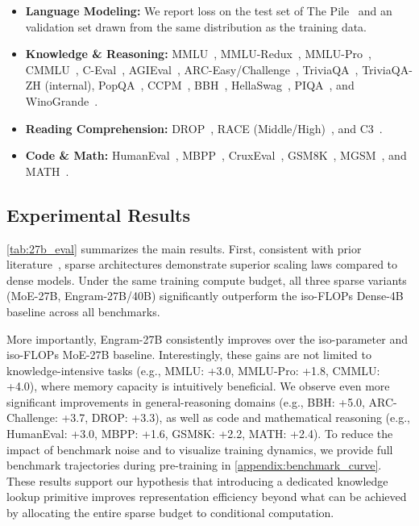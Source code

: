 \begin{itemize}
    \item \textbf{Language Modeling:}
    We report loss on the test set of The Pile~\citep{gao2020pile} and an validation set drawn from the same distribution as the training data.

    \item \textbf{Knowledge \& Reasoning:}
    MMLU~\citep{hendrycks2020measuring}, MMLU-Redux~\citep{gema2025we}, MMLU-Pro~\citep{wang2024mmlu}, CMMLU~\citep{li2024cmmlu}, C-Eval~\citep{huang2023c}, AGIEval~\citep{zhong2024agieval}, ARC-Easy/Challenge~\citep{clark2018think}, TriviaQA~\citep{joshi2017triviaqa}, TriviaQA-ZH (internal), PopQA~\citep{mallen2023not}, CCPM~\citep{li2021ccpm}, BBH~\citep{suzgun2023challenging}, HellaSwag~\citep{zellers2019hellaswag}, PIQA~\citep{bisk2020piqa}, and WinoGrande~\citep{sakaguchi2021winogrande}.

    \item \textbf{Reading Comprehension:}
    DROP~\citep{dua2019drop}, RACE (Middle/High)~\citep{lai2017race}, and C3~\citep{sun2020investigating}.

    \item \textbf{Code \& Math:}
    HumanEval~\citep{chen2021evaluatinglargelanguagemodels}, MBPP~\citep{austin2021program}, CruxEval~\citep{gu2024cruxeval}, GSM8K~\citep{cobbe2021training}, MGSM~\citep{shi2022language}, and MATH~\citep{hendrycks2021measuring}.
\end{itemize}

\subsection{Experimental Results}

\autoref{tab:27b_eval} summarizes the main results.
First, consistent with prior literature~\citep{shazeer2017outrageously,he2024mixture,borgeaud2022improving}, sparse architectures demonstrate superior scaling laws compared to dense models. Under the same training compute budget, all three sparse variants (MoE-27B, Engram-27B/40B) significantly outperform the iso-FLOPs Dense-4B baseline across all benchmarks.

More importantly, Engram-27B consistently improves over the iso-parameter and iso-FLOPs MoE-27B baseline. Interestingly, these gains are not limited to knowledge-intensive tasks (e.g., MMLU: +3.0, MMLU-Pro: +1.8, CMMLU: +4.0), where memory capacity is intuitively beneficial. We observe even more significant improvements in general-reasoning domains (e.g., BBH: +5.0, ARC-Challenge: +3.7, DROP: +3.3), as well as code and mathematical reasoning (e.g., HumanEval: +3.0, MBPP: +1.6, GSM8K: +2.2, MATH: +2.4). To reduce the impact of benchmark noise and to visualize training dynamics, we provide full benchmark trajectories during pre-training in \autoref{appendix:benchmark_curve}.
These results support our hypothesis that introducing a dedicated knowledge lookup primitive improves representation efficiency beyond what can be achieved by allocating the entire sparse budget to conditional computation.

